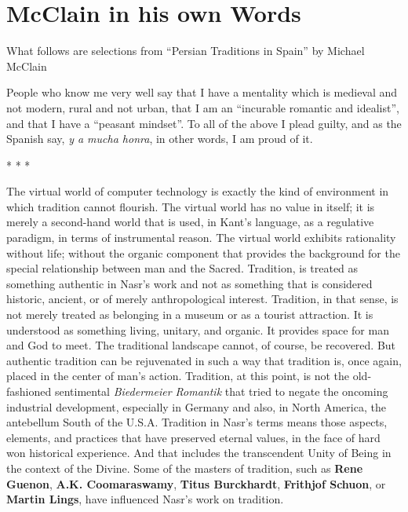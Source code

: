 \section{McClain in his own Words}

What follows are selections from ``Persian Traditions in Spain'' by Michael McClain

People who know me very well say that I have a mentality which is medieval and not modern, rural and not urban, that I am an ``incurable romantic and idealist'', and that I have a ``peasant mindset''. To all of the above I plead guilty, and as the Spanish say, \emph{y a mucha honra}, in other words, I am proud of it.

\begin{center} * * * \end{center}

The virtual world of computer technology is exactly the kind of environment in which tradition cannot flourish. The virtual world has no value in itself; it is merely a second-hand world that is used, in Kant's language, as a regulative paradigm, in terms of instrumental reason. The virtual world exhibits rationality without life; without the organic component that provides the background for the special relationship between man and the Sacred. Tradition, is treated as something authentic in Nasr's work and not as something that is considered historic, ancient, or of merely anthropological interest. Tradition, in that sense, is not merely treated as belonging in a museum or as a tourist attraction. It is understood as something living, unitary, and organic. It provides space for man and God to meet. The traditional landscape cannot, of course, be recovered. But authentic tradition can be rejuvenated in such a way that tradition is, once again, placed in the center of man's action. Tradition, at this point, is not the old-fashioned sentimental \emph{Biedermeier Romantik} that tried to negate the oncoming industrial development, especially in Germany and also, in North America, the antebellum South of the U.S.A. Tradition in Nasr's terms means those aspects, elements, and practices that have preserved eternal values, in the face of hard won historical experience. And that includes the transcendent Unity of Being in the context of the Divine. Some of the masters of tradition, such as \textbf{Rene Guenon}, \textbf{A.K. Coomaraswamy}, \textbf{Titus Burckhardt}, \textbf{Frithjof Schuon}, or \textbf{Martin Lings}, have influenced Nasr's work on tradition.

